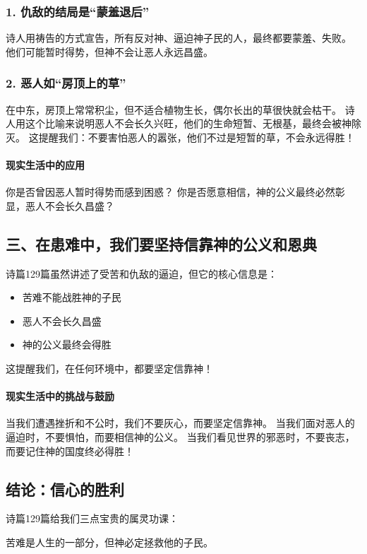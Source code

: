\documentclass[a4paper, 12pt]{article}
\begin{document}
\subsubsection*{1. 仇敌的结局是“蒙羞退后”}
诗人用祷告的方式宣告，所有反对神、逼迫神子民的人，最终都要蒙羞、失败。
他们可能暂时得势，但神不会让恶人永远昌盛。
\subsubsection*{2. 恶人如“房顶上的草”}
在中东，房顶上常常积尘，但不适合植物生长，偶尔长出的草很快就会枯干。
诗人用这个比喻来说明恶人不会长久兴旺，他们的生命短暂、无根基，最终会被神除灭。
这提醒我们：不要害怕恶人的嚣张，他们不过是短暂的草，不会永远得胜！
\paragraph*{现实生活中的应用}

你是否曾因恶人暂时得势而感到困惑？
你是否愿意相信，神的公义最终必然彰显，恶人不会长久昌盛？
\subsection*{三、在患难中，我们要坚持信靠神的公义和恩典}
诗篇129篇虽然讲述了受苦和仇敌的逼迫，但它的核心信息是：
\begin{itemize}
    \item 苦难不能战胜神的子民

    \item 恶人不会长久昌盛

    \item 神的公义最终会得胜

\end{itemize}

这提醒我们，在任何环境中，都要坚定信靠神！

\paragraph*{现实生活中的挑战与鼓励}

当我们遭遇挫折和不公时，我们不要灰心，而要坚定信靠神。
当我们面对恶人的逼迫时，不要惧怕，而要相信神的公义。
当我们看见世界的邪恶时，不要丧志，而要记住神的国度终必得胜！
\subsection*{结论：信心的胜利}
诗篇129篇给我们三点宝贵的属灵功课：

苦难是人生的一部分，但神必定拯救他的子民。
\end{document}
